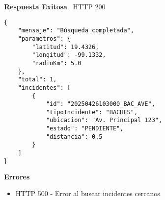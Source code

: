 \begin{tcolorbox}[response]
    \textbf{Respuesta Exitosa} \faCheckCircle\ \textcolor{successColor}{HTTP 200}
    \begin{verbatim}
{
    "mensaje": "Búsqueda completada",
    "parametros": {
        "latitud": 19.4326,
        "longitud": -99.1332,
        "radioKm": 5.0
    },
    "total": 1,
    "incidentes": [
        {
            "id": "20250426103000_BAC_AVE",
            "tipoIncidente": "BACHES",
            "ubicacion": "Av. Principal 123",
            "estado": "PENDIENTE",
            "distancia": 0.5
        }
    ]
}
    \end{verbatim}
    \textbf{Errores}
    \begin{itemize}
        \item \textcolor{errorColor}{HTTP 500} - Error al buscar incidentes cercanos
    \end{itemize}
\end{tcolorbox}